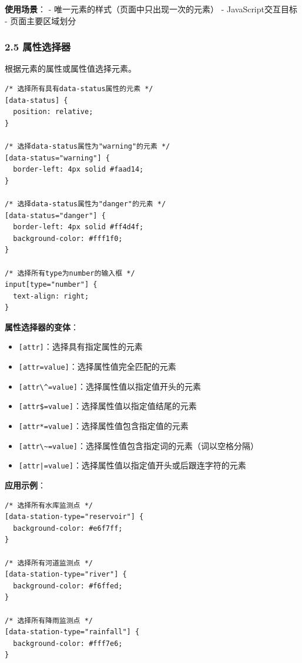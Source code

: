 \textbf{使用场景}： - 唯一元素的样式（页面中只出现一次的元素） -
JavaScript交互目标 - 页面主要区域划分

\subsubsection{2.5 属性选择器}\label{ux5c5eux6027ux9009ux62e9ux5668}

根据元素的属性或属性值选择元素。

\begin{lstlisting}
/* 选择所有具有data-status属性的元素 */
[data-status] {
  position: relative;
}

/* 选择data-status属性为"warning"的元素 */
[data-status="warning"] {
  border-left: 4px solid #faad14;
}

/* 选择data-status属性为"danger"的元素 */
[data-status="danger"] {
  border-left: 4px solid #ff4d4f;
  background-color: #fff1f0;
}

/* 选择所有type为number的输入框 */
input[type="number"] {
  text-align: right;
}
\end{lstlisting}

\textbf{属性选择器的变体}：

\begin{itemize}
\tightlist
\item
  \passthrough{\lstinline![attr]!}：选择具有指定属性的元素
\item
  \passthrough{\lstinline![attr=value]!}：选择属性值完全匹配的元素
\item
  \passthrough{\lstinline![attr\^=value]!}：选择属性值以指定值开头的元素
\item
  \passthrough{\lstinline![attr$=value]!}：选择属性值以指定值结尾的元素
\item
  \passthrough{\lstinline![attr*=value]!}：选择属性值包含指定值的元素
\item
  \passthrough{\lstinline![attr\~=value]!}：选择属性值包含指定词的元素（词以空格分隔）
\item
  \passthrough{\lstinline![attr|=value]!}：选择属性值以指定值开头或后跟连字符的元素
\end{itemize}

\textbf{应用示例}：

\begin{lstlisting}
/* 选择所有水库监测点 */
[data-station-type="reservoir"] {
  background-color: #e6f7ff;
}

/* 选择所有河道监测点 */
[data-station-type="river"] {
  background-color: #f6ffed;
}

/* 选择所有降雨监测点 */
[data-station-type="rainfall"] {
  background-color: #fff7e6;
}
\end{lstlisting}

